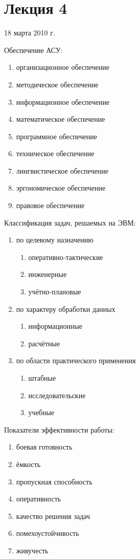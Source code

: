\documentclass[a4paper,12pt]{article}
\begin{document}
	\section{Лекция 4}
	\centerline{18 марта 2010 г.}
	Обеспечение АСУ:
	\begin{enumerate}
		\item организационное обеспечение
		\item методическое обеспечение
		\item информационное обеспечение
		\item математическое обеспечение
		\item программное обеспечение
		\item техническое обеспечение
		\item лингвистическое обеспечение
		\item эргономическое обеспечение
		\item правовое обеспечение
	\end{enumerate}
	Классификация задач, решаемых на ЭВМ:
	\begin{enumerate}
		\item по целевому назначению
			\begin{enumerate}
				\item оперативно-тактические
				\item инженерные
				\item учётно-плановые
			\end{enumerate}
		\item по характеру обработки данных
			\begin{enumerate}
				\item информационные
				\item расчётные
			\end{enumerate}
		\item по области практического применения
			\begin{enumerate}
				\item штабные
				\item исследовательские
				\item учебные
			\end{enumerate}
	\end{enumerate}
	Показатели эффективности работы:
	\begin{enumerate}
		\item боевая готовность
		\item ёмкость
		\item пропускная способность
		\item оперативность
		\item качество решения задач
		\item помехоустойчивость
		\item живучесть
	\end{enumerate}
\end{document}
